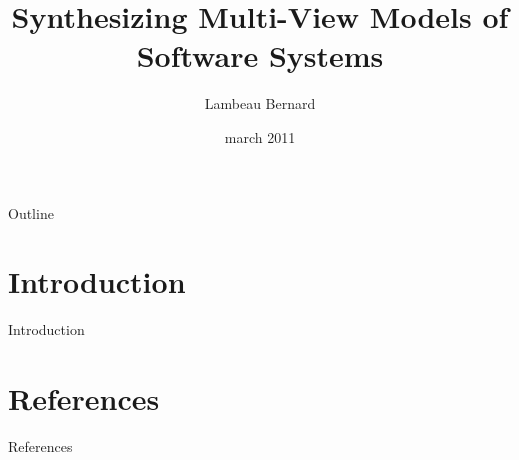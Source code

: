 \documentclass[11pt]{beamer}
\title{Synthesizing Multi-View Models of Software Systems}
\author{Lambeau Bernard}
\institute{UCL/EPL/INGI}
\date{march 2011}
\begin{document}
\begin{frame}
    \titlepage 
\end{frame}

\begin{frame}{Outline}
	\small
	\tableofcontents
\end{frame} 

\section{Introduction} 
\begin{frame}{Introduction} 
  \cite{AVL09}
\end{frame}

\section{References}

\begin{frame}[allowframebreaks]{References}
	\tiny
	
	 
\end{frame}
\end{document}
